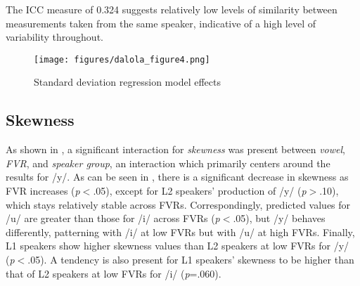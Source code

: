 \documentclass[output=paper,colorlinks,citecolor=brown,draftmode]{langscibook}
\begin{document}
The ICC measure of 0.324 suggests relatively low levels of similarity between measurements taken from the same speaker, indicative of a high level of variability throughout.

\begin{figure}
    \texttt{[image: figures/dalola\_figure4.png]}
    \caption{Standard deviation regression model effects}
    \label{figure4}
\end{figure}

\subsection{Skewness}


As shown in , a significant interaction for \emph{skewness} was present between \emph{vowel}, \emph{FVR}, and \emph{speaker group}, an interaction which primarily centers around the results for /y/.  As can be seen in , there is a significant decrease in skewness as FVR increases (\emph{p}$<$.05), except for L2 speakers’ production of /y/ (\emph{p}$>$.10), which stays relatively stable across FVRs. Correspondingly, predicted values for /u/ are greater than those for /i/ across FVRs (\emph{p}$<$.05), but /y/ behaves differently, patterning with /i/ at low FVRs but with /u/ at high FVRs. Finally, L1 speakers show higher skewness values than L2 speakers at low FVRs for /y/ (\emph{p}$<$.05).  A tendency is also present for L1 speakers’ skewness to be higher than that of L2 speakers at low FVRs for /i/ (\emph{p}=.060).
\end{document}
